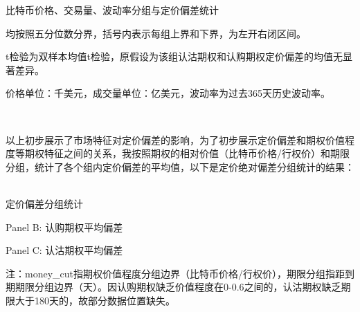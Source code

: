 \begin{center}
    \begin{threeparttable}[H]
        \caption{比特币价格、交易量、波动率分组与定价偏差统计}
        \label{return_grouped_bias}
        
        \bigskip
        
        \bigskip
        
        \begin{tablenotes}
            \footnotesize
            \item 均按照五分位数分界，括号内表示每组上界和下界，为左开右闭区间。
            \item t检验为双样本均值t检验，原假设为该组认沽期权和认购期权定价偏差的均值无显著差异。
            \item 价格单位：千美元，成交量单位：亿美元，波动率为过去365天历史波动率。
        \end{tablenotes}
    \end{threeparttable}
    
\end{center}
~\\
\par{以上初步展示了市场特征对定价偏差的影响，为了初步展示定价偏差和期权价值程度等期权特征之间的关系，我按照期权的相对价值（比特币价格/行权价）和期限分组，统计了各个组内定价偏差的平均值，以下是定价绝对偏差分组统计的结果：}
~\\
\begin{center}
\begin{threeparttable}[HT]
\centering
\caption{定价偏差分组统计}
\label{grouped}
\label{tab:option_bias_group}
\begin{small}


\bigskip

\caption*{Panel B: 认购期权平均偏差}
\bigskip

\caption*{Panel C: 认沽期权平均偏差}
\begin{tablenotes}
\footnotesize
\item 注：money\_cut指期权价值程度分组边界（比特币价格/行权价），期限分组指距到期期限分组边界（天）。因认购期权缺乏价值程度在0-0.6之间的，认沽期权缺乏期限大于180天的，故部分数据位置缺失。
\end{tablenotes}
\end{small}
\end{threeparttable}

\end{center}
